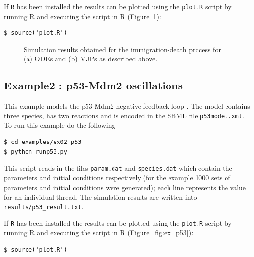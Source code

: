 \documentclass [11pt, a4paper, openany, twoside=off] {article}
\begin{document}
If \verb$R$ has been installed the results can be plotted using the \verb$plot.R$ script by running R and executing the script in R (Figure~\ref{fig:ex_immdeath}):
\begin{verbatim}
$ source('plot.R')
\end{verbatim}
\begin{figure}[h!]%
	\centering
	\caption{Simulation results obtained for the immigration-death process for (a) ODEs and (b) MJPs as described above.}
	\label{fig:ex_immdeath}
\end{figure}

\newpage
\subsection{Example2 : p53-Mdm2 oscillations}
This example models the p53-Mdm2 negative feedback loop \citep{??}. The model contains three species, has two reactions and is encoded in the SBML file \verb$p53model.xml$.
To run this example do the following
\begin{verbatim}
$ cd examples/ex02_p53
$ python runp53.py
\end{verbatim}
This script reads in the files \verb$param.dat$ and \verb$species.dat$ which contain the parameters and initial conditions respectively (for the example 1000 sets of parameters and initial conditions were generated); each line represents the value for an individual thread. The simulation results are written into \verb$results/p53_result.txt$.

If \verb$R$ has been installed the results can be plotted using the \verb$plot.R$ script by running R and executing the script in R (Figure~\ref{fig:ex_p53}):
\begin{verbatim}
$ source('plot.R')
\end{verbatim}
\end{document}
